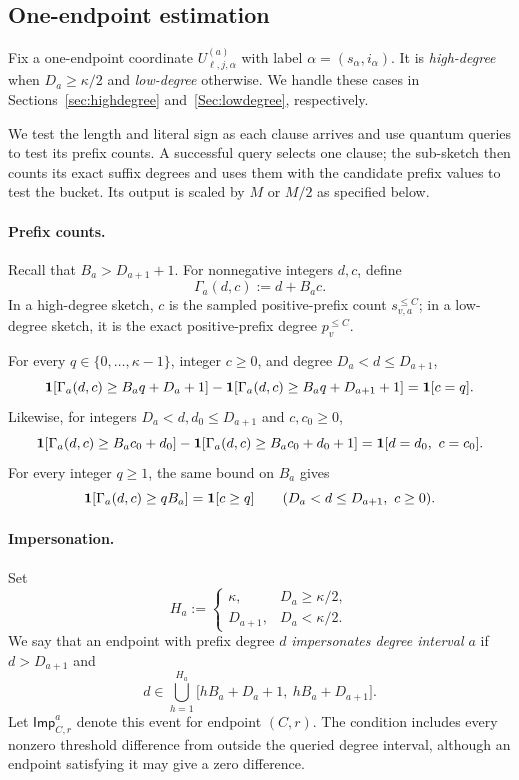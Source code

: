 \subsection{One-endpoint estimation} \label{subsec:One-endpoint_estimation}

Fix a one-endpoint coordinate $U^{(a)}_{\ell,j,\alpha}$ with label $\alpha=(s_\alpha,i_\alpha)$. It is \textit{high-degree} when $D_a\ge\kappa/2$ and \textit{low-degree} otherwise. We handle these cases in Sections~\ref{sec:highdegree} and~\ref{Sec:lowdegree}, respectively.

We test the length and literal sign as each clause arrives and use quantum queries to test its prefix counts. A successful query selects one clause; the sub-sketch then counts its exact suffix degrees and uses them with the candidate prefix values to test the bucket. Its output is scaled by $M$ or $M/2$ as specified below.

\paragraph{Prefix counts.}
Recall that $B_a>D_{a+1}+1$. For nonnegative integers $d,c$, define
\[
  \Gamma_a(d,c):=d+B_a c.
\]
In a high-degree sketch, $c$ is the sampled positive-prefix count $s_{v,a}^{\le C}$; in a low-degree sketch, it is the exact positive-prefix degree $p_v^{\le C}$.

For every $q\in\{0,\ldots,\kappa-1\}$, integer $c\ge0$, and degree $D_a<d\le D_{a+1}$,
\begin{equation}\label{eq:one-endpoint-ordinary-high-id}
\mathbf 1[\Gamma_a(d,c)\ge B_a q+D_a+1]
-\mathbf 1[\Gamma_a(d,c)\ge B_a q+D_{a+1}+1]
=
\mathbf 1[c=q].
\end{equation}
Likewise, for integers $D_a<d,d_0\le D_{a+1}$ and $c,c_0\ge0$,
\begin{equation}\label{eq:one-endpoint-ordinary-low-id}
\mathbf 1[\Gamma_a(d,c)\ge B_a c_0+d_0]
-\mathbf 1[\Gamma_a(d,c)\ge B_a c_0+d_0+1]
=
\mathbf 1[d=d_0,\ c=c_0].
\end{equation}
For every integer $q\ge1$, the same bound on $B_a$ gives
\begin{equation}\label{eq:one-endpoint-cumulative-high-id}
\mathbf 1[\Gamma_a(d,c)\ge qB_a]=\mathbf 1[c\ge q]
\qquad(D_a<d\le D_{a+1},\ c\ge0).
\end{equation}

\paragraph{Impersonation.}
Set
\[
H_a:=
\begin{cases}
\kappa, & D_a\ge\kappa/2,\\
D_{a+1}, & D_a<\kappa/2.
\end{cases}
\]
We say that an endpoint with prefix degree $d$ \emph{impersonates degree interval $a$} if $d>D_{a+1}$ and
\begin{equation}\label{eq:scale-a-impersonation-def}
d\in
\bigcup_{h=1}^{H_a}
\bigl[hB_a+D_a+1,\ hB_a+D_{a+1}\bigr].
\end{equation}
Let $\mathsf{Imp}^{a}_{C,r}$ denote this event for endpoint $(C,r)$. The condition includes every nonzero threshold difference from outside the queried degree interval, although an endpoint satisfying it may give a zero difference.

